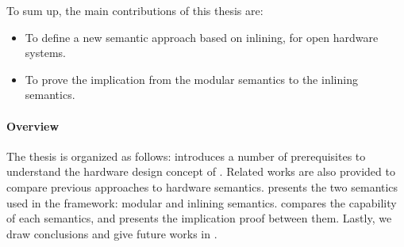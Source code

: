 To sum up, the main contributions of this thesis are:
\begin{itemize}
\item To define a new semantic approach based on inlining, for open
  hardware systems.
\item To prove the implication from the modular semantics to the
  inlining semantics.
\end{itemize}

\paragraph{Overview}

The thesis is organized as follows: 
introduces a number of prerequisites to understand the hardware design
concept of \Bluespec{}. Related works are also provided to compare
previous approaches to hardware semantics. 
presents the two semantics used in the \Kami{} framework: modular and
inlining semantics.  compares the capability
of each semantics, and presents the implication proof between
them. Lastly, we draw conclusions and give future works in
.

